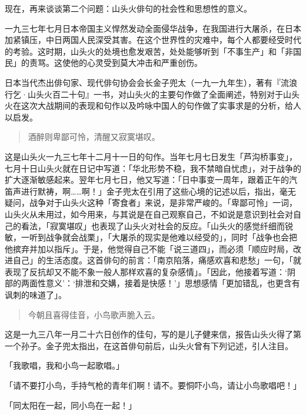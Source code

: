 {    现在，再来谈谈第二个问题：山头火俳句的社会性和思想性的意义。

    一九三七年七月日本帝国主义悍然发动全面侵华战争，在我国进行大屠杀，在日本加紧镇压，中日两国人民深受其害。在这个世界性的灾难中，每个人都要经受时代的考验。这时期，山头火的处境也愈发艰苦，处处能够听到「不事生产」和「非国民」的责骂。这使他的心灵受到莫大冲击和严重创伤。

    日本当代杰出俳句家、现代俳句协会会长金子兜太（一九一九年生），著有『流浪行乞·山头火百二十句』一书，对山头火的主要句作做了全面阐述，特别对于山头火在这次大战期间的表现和句作以及吟咏中国人的句作做了实事求是的分析，给人以启发。
    \begin{quote}
        酒醉则卑鄙可怜，清醒又寂寞堪叹。
    \end{quote}

    这是山头火一九三七年十二月十一日的句作。当年七月七日发生「芦沟桥事变」，七月十日山头火就在日记中写道：「华北形势不稳，我不禁暗自忧虑」，对于战争的扩大逐渐敏感起来。翌年七月七日，他又写道：「日中事变一周年，跟着正午的汽笛声进行默祷\footnotemark[10]，啊……啊！」金子兜太在引用了这些心境的记述以后，指出，毫无疑问，战争对于山头火这种「寄食者」来说，是非常严峻的。「卑鄙可怜」一词，山头火从未用过，如今用来，与其说是在自己观察自己，不如说是意识到社会对自己的看法，「寂寞堪叹」也表现了山头火对社会的反应。「山头火的感觉纤细而锐敏，一听到战争就会战栗」，「大屠杀的现实是他难以经受的」，同时「战争也会把他摈弃并加以指斥」。于是，他觉得自己不能「说三道四」，而必须「顺应时局，改进自己」的生活态度。这首俳句的前言：「南京陷落，痛感欢喜和悲愁」一句，「就表现了反抗却又不能不象一般人那样欢喜的复杂感情」。「因此，他接着写道：‘阴部的两面性意义’：‘排泄和交媾，接着是快感！’」思想感情「更加错乱，也更含有讽刺的味道了」。


    \begin{quote}
        今朝且喜得佳音，小鸟歌声脆入云。
    \end{quote}

    这是一九三八年一月二十六日创作的佳句，写的是儿子健来信，报告山头火得了第一个孙子。金子兜太指出，在这首俳句前后，山头火曾有下列记述，引人注目。

    「我歌唱，我和小鸟一起歌唱。」

    「请不要打小鸟，手持气枪的青年们啊！请不。要恫吓小鸟，请让小鸟歌唱吧！」

    「同太阳在一起，同小鸟在一起！」

}
